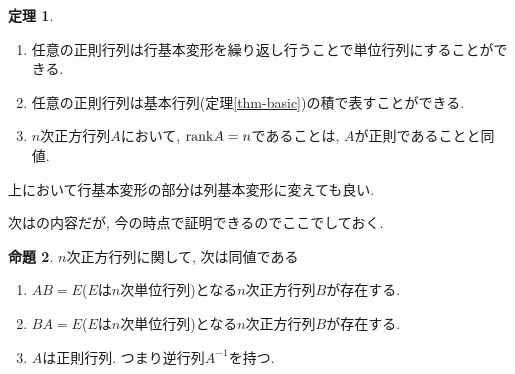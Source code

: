 \documentclass[dvipdfmx,a4paper,11pt]{article}
\theoremstyle{definition}
\newtheorem{thm}{定理}
\newtheorem{prop}[thm]{命題}
\begin{document}
\begin{tcolorbox}[
    colback = white,
    colframe = green!35!black,
    fonttitle = \bfseries,
    breakable = true]
    \begin{thm}\cite[定理2.4]{M}
 \begin{enumerate}
   \setlength{\parskip}{0cm} 
  \setlength{\itemsep}{0cm}
    \item 任意の正則行列は行基本変形を繰り返し行うことで単位行列にすることができる.
  \item 任意の正則行列は基本行列(定理\ref{thm-basic})の積で表すことができる. 
  \item $n$次正方行列$A$において, ${\rm rank} A =n$であることは, $A$が正則であることと同値. 
 \end{enumerate}
  \end{thm}
  \end{tcolorbox}
上において行基本変形の部分は列基本変形に変えても良い.

次は\cite[2.8節]{M}の内容だが, 今の時点で証明できるのでここでしておく.
\begin{tcolorbox}[
    colback = white,
    colframe = green!35!black,
    fonttitle = \bfseries,
    breakable = true]
    \begin{prop}\cite[定義2.6]{M}
$n$次正方行列に関して, 次は同値である
 \begin{enumerate}
   \setlength{\parskip}{0cm} 
  \setlength{\itemsep}{0cm}
  \item$AB=E$($E$は$n$次単位行列)となる$n$次正方行列$B$が存在する. 
    \item$BA=E$($E$は$n$次単位行列)となる$n$次正方行列$B$が存在する. 
      \item$A$は正則行列. つまり逆行列$A^{-1}$を持つ. 
 \end{enumerate}
  \end{prop}
  \end{tcolorbox}
  
\end{document}
